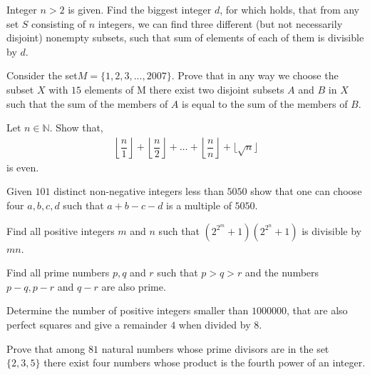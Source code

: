 \documentclass[problems.tex]{subfile}
\begin{document}
	\begin{problem}
		Integer $n>2$ is given. Find the biggest integer $d$, for which holds, that from any set $S$ consisting of $n$ integers, we can find three different (but not necessarily disjoint) nonempty subsets, such that sum of elements of each of them is divisible by $d$.
	\end{problem}
	
	\begin{problem}
		Consider the set$ M = \{1, 2, 3, . . . , 2007\}$. Prove that in any way we choose the subset $X$ with $15$ elements of M there exist two disjoint subsets         $A$ and $B$ in $X$ such that the sum of the members of $A$ is equal to the sum of the members of $B$.
	\end{problem}
	
	\begin{problem}[India $2014$]
		Let $n\in\mathbb{N}$. Show that,	
			\begin{align*}
				\left\lfloor\dfrac{n}{1}\right\rfloor+\left\lfloor\dfrac{n}{2}\right\rfloor+\ldots+\left\lfloor\dfrac{n}{n}\right\rfloor+
				\lfloor\sqrt{n}\rfloor
			\end{align*}
		is even.
	\end{problem}
	
	\begin{problem}
		Given $101$ distinct non-negative integers less than $5050$ show that one can choose four $a, b, c, d$ such that $a + b - c - d$ is a multiple of $5050$.
	\end{problem}
	
	\begin{problem}
		Find all positive integers $m$ and $n$ such that $\left(2^{2^m}+1\right)\left(2^{2^n}+1\right)$ is divisible by $mn$.
	\end{problem}
	
	\begin{problem}[Slovenia $2010$]
		Find all prime numbers $p, q$ and $r$ such that $p > q > r$ and the numbers $p-q,p-r$ and $q-r$ are also prime.
	\end{problem}
	
	\begin{problem}
		Determine the number of positive integers smaller than $1000000$, that are also perfect squares and give a remainder $4$ when divided by $8$.
	\end{problem}
	
	\begin{problem}
		Prove that among $81$ natural numbers whose prime divisors are in the set $\{2, 3, 5\}$ there exist four numbers whose product is the fourth power of an integer.
	\end{problem}
	
\end{document}
